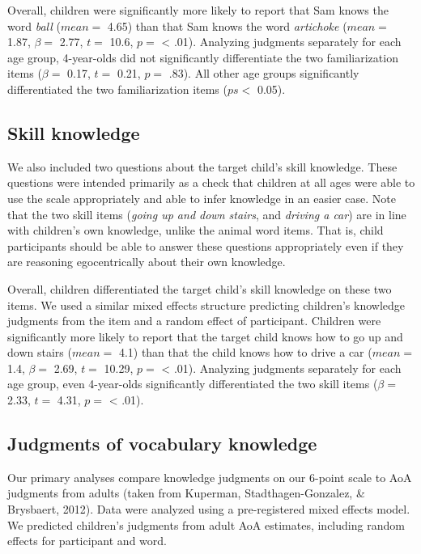 \documentclass[10pt, letterpaper]{article}
\begin{document}
Overall, children were significantly more likely to report that Sam
knows the word \emph{ball} (\(mean =\) 4.65) than that Sam knows the
word \emph{artichoke} (\(mean =\) 1.87, \(\beta =\) 2.77, \(t =\) 10.6,
\(p =\) \textless{} .01). Analyzing judgments separately for each age
group, 4-year-olds did not significantly differentiate the two
familiarization items (\(\beta =\) 0.17, \(t =\) 0.21, \(p =\) .83). All
other age groups significantly differentiated the two familiarization
items (\(ps <\) 0.05).

\hypertarget{skill-knowledge}{%
\subsection{Skill knowledge}\label{skill-knowledge}}

We also included two questions about the target child's skill knowledge.
These questions were intended primarily as a check that children at all
ages were able to use the scale appropriately and able to infer
knowledge in an easier case. Note that the two skill items (\emph{going
up and down stairs}, and \emph{driving a car}) are in line with
children's own knowledge, unlike the animal word items. That is, child
participants should be able to answer these questions appropriately even
if they are reasoning egocentrically about their own knowledge.

Overall, children differentiated the target child's skill knowledge on
these two items. We used a similar mixed effects structure predicting
children's knowledge judgments from the item and a random effect of
participant. Children were significantly more likely to report that the
target child knows how to go up and down stairs (\(mean =\) 4.1) than
that the child knows how to drive a car (\(mean =\) 1.4, \(\beta =\)
2.69, \(t =\) 10.29, \(p =\) \textless{} .01). Analyzing judgments
separately for each age group, even 4-year-olds significantly
differentiated the two skill items (\(\beta =\) 2.33, \(t =\) 4.31,
\(p =\) \textless{} .01).

\hypertarget{judgments-of-vocabulary-knowledge}{%
\subsection{Judgments of vocabulary
knowledge}\label{judgments-of-vocabulary-knowledge}}

Our primary analyses compare knowledge judgments on our 6-point scale to
AoA judgments from adults (taken from Kuperman, Stadthagen-Gonzalez, \&
Brysbaert, 2012). Data were analyzed using a pre-registered mixed
effects model. We predicted children's judgments from adult AoA
estimates, including random effects for participant and word.
\end{document}
